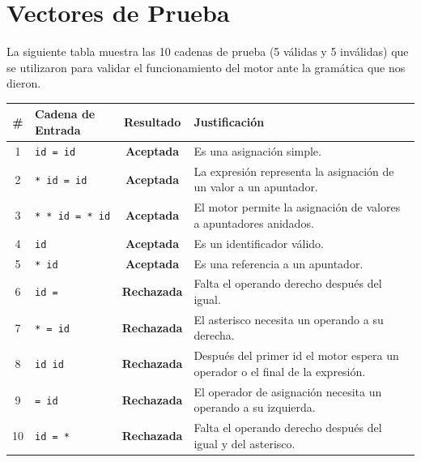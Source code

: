 \documentclass[12pt, letterpaper]{article}
\begin{document}
\newpage

\section{Vectores de Prueba}

La siguiente tabla muestra las 10 cadenas de prueba (5 válidas y 5 inválidas) que se utilizaron para validar el funcionamiento del motor ante la gramática que nos dieron.

\begin{table}[h!]
    \centering
    \small
    \renewcommand{\arraystretch}{1.4}
    \begin{tabular}{c p{3.5cm} c p{6cm}}
        \toprule
        \textbf{\#} & \textbf{Cadena de Entrada} & \textbf{Resultado} & \textbf{Justificación} \\
        \midrule
        1 & \texttt{id = id} & \textbf{\color{primary}Aceptada} & Es una asignación simple. \\
        2 & \texttt{* id = id} & \textbf{\color{primary}Aceptada} & La expresión representa la asignación de un valor a un apuntador. \\
        3 & \texttt{* * id = * id} & \textbf{\color{primary}Aceptada} & El motor permite la asignación de valores a apuntadores anidados. \\
        4 & \texttt{id} & \textbf{\color{primary}Aceptada} & Es un identificador válido. \\
        5 & \texttt{* id} & \textbf{\color{primary}Aceptada} & Es una referencia a un apuntador. \\
        6 & \texttt{id =} & \textbf{\color{accent}Rechazada} & Falta el operando derecho después del igual. \\
        7 & \texttt{* = id} & \textbf{\color{accent}Rechazada} & El asterisco necesita un operando a su derecha. \\
        8 & \texttt{id id} & \textbf{\color{accent}Rechazada} & Después del primer id el motor espera un operador o el final de la expresión. \\
        9 & \texttt{= id} & \textbf{\color{accent}Rechazada} & El operador de asignación necesita un operando a su izquierda. \\
        10 & \texttt{id = *} & \textbf{\color{accent}Rechazada} & Falta el operando derecho después del igual y del asterisco. \\
        \bottomrule
    \end{tabular}
\end{table}
\end{document}
